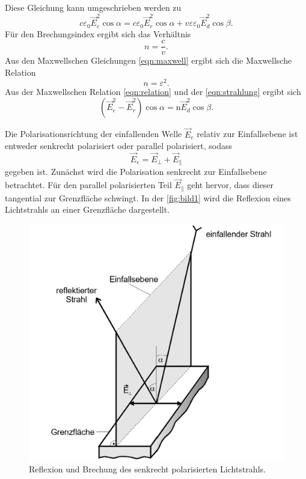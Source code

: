 Diese Gleichung kann umgeschrieben werden zu 
\begin{equation}
        c \varepsilon_0 \vec{E}_e^2 \cos \alpha=c \varepsilon_0 \vec{E}_r^2 \cos \alpha+v \varepsilon \varepsilon_0 \vec{E}_d^2 \cos \beta.
        \label{eqn:strahlung}
\end{equation}
Für den Brechungsindex ergibt sich das Verhältnis
\begin{equation}
    n = \frac{c}{v}.
    \label{eqn:brechungsindex}
\end{equation}
Aus den Maxwellschen Gleichungen \eqref{eqn:maxwell} ergibt sich die Maxwellsche Relation
\begin{equation}
    n = \varepsilon^2 .
    \label{eqn:relation}
\end{equation}
Aus der Maxwellschen Relation \eqref{eqn:relation} und der \autoref{eqn:strahlung} ergibt sich 
\begin{equation}
    \left(\vec{E}_e^2-\vec{E}_r^2\right) \cos \alpha=\mathrm{n} \vec{E}_d^2 \cos \beta .
\end{equation}

Die Polarisationsrichtung der einfallenden Welle $\vec{E}_e$ relativ zur Einfallsebene ist entweder senkrecht polarisiert oder parallel polarisiert,
sodass
\begin{equation}
        \vec{E}_e=\vec{E}_{\perp}+\vec{E}_{\|}
\end{equation}
gegeben ist.
Zunächst wird die Polarisation senkrecht zur Einfallsebene betrachtet. Für den parallel polarisierten Teil $\vec{E}_{\|}$ geht hervor, dass 
dieser tangential zur Grenzfläche schwingt. In der \autoref{fig:bild1} wird die Reflexion eines Lichtstrahls an einer Grenzfläche 
dargestellt.

\begin{figure}[H]
	\centering
	\includegraphics[width=0.6\linewidth]{content/grafik/bild1.png}
	\caption{Reflexion und Brechung des senkrecht polarisierten Lichtstrahls. \cite{fresnel}}
	\label{fig:bild1}
\end{figure}

